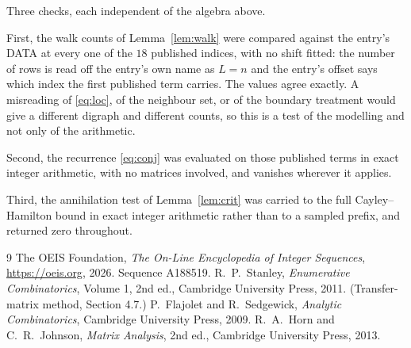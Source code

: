 \documentclass[11pt,a4paper]{article}
\theoremstyle{plain}
\theoremstyle{definition}
\begin{document}
Three checks, each independent of the algebra above.

First, the walk counts of Lemma~\ref{lem:walk} were compared against the entry's DATA at
every one of the $18$ published indices, with no shift fitted: the number of rows is
read off the entry's own name as $L=n$ and the entry's offset says which index the first
published term carries. The values agree exactly. A misreading of \eqref{eq:loc}, of the
neighbour set, or of the boundary treatment would give a different digraph and different
counts, so this is a test of the modelling and not only of the arithmetic.

Second, the recurrence \eqref{eq:conj} was evaluated on those published terms in exact
integer arithmetic, with no matrices involved, and vanishes wherever it applies.

Third, the annihilation test of Lemma~\ref{lem:crit} was carried to the full
Cayley--Hamilton bound in exact integer arithmetic rather than to a sampled prefix, and
returned zero throughout.

\begin{thebibliography}{9}
 The OEIS Foundation, \emph{The On-Line Encyclopedia of Integer
Sequences}, \url{https://oeis.org}, 2026. Sequence A188519.
 R.~P.~Stanley, \emph{Enumerative Combinatorics}, Volume 1, 2nd ed.,
Cambridge University Press, 2011. (Transfer-matrix method, Section 4.7.)
 P.~Flajolet and R.~Sedgewick, \emph{Analytic Combinatorics}, Cambridge
University Press, 2009.
 R.~A.~Horn and C.~R.~Johnson, \emph{Matrix Analysis}, 2nd ed., Cambridge
University Press, 2013.
\end{thebibliography}
\end{document}
